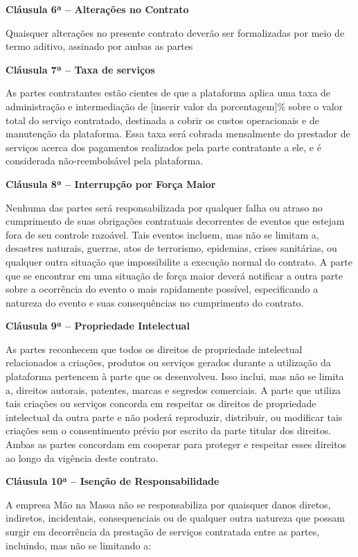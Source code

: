 \documentclass[a4paper,12pt]{article}
\begin{document}
\large{\textbf{Cláusula 6ª – Alterações no Contrato}}
\normalsize

Quaisquer alterações no presente contrato deverão ser formalizadas por meio de termo aditivo, assinado por ambas as partes

\large{\textbf{Cláusula 7ª – Taxa de serviços}}
\normalsize

As partes contratantes estão cientes de que a plataforma aplica uma taxa de administração e intermediação de [inserir valor da porcentagem]\% sobre o valor total do serviço contratado, destinada a cobrir os custos operacionais e de manutenção da plataforma. Essa taxa será  cobrada mensalmente do prestador de serviços acerca dos pagamentos realizados pela parte contratante a ele, e é considerada não-reembolsável pela plataforma.

\large{\textbf{Cláusula 8ª – Interrupção por Força Maior}}
\normalsize

Nenhuma das partes será responsabilizada por qualquer falha ou atraso no cumprimento de suas obrigações contratuais decorrentes de eventos que estejam fora de seu controle razoável. Tais eventos incluem, mas não se limitam a, desastres naturais, guerras, atos de terrorismo, epidemias, crises sanitárias, ou qualquer outra situação que impossibilite a execução normal do contrato. A parte que se encontrar em uma situação de força maior deverá notificar a outra parte sobre a ocorrência do evento o mais rapidamente possível, especificando a natureza do evento e suas consequências no cumprimento do contrato.

\large{\textbf{Cláusula 9ª – Propriedade Intelectual}}
\normalsize

As partes reconhecem que todos os direitos de propriedade intelectual relacionados a criações, produtos ou serviços gerados durante a utilização da plataforma pertencem à parte que os desenvolveu. Isso inclui, mas não se limita a, direitos autorais, patentes, marcas e segredos comerciais. A parte que utiliza tais criações ou serviços concorda em respeitar os direitos de propriedade intelectual da outra parte e não poderá reproduzir, distribuir, ou modificar tais criações sem o consentimento prévio por escrito da parte titular dos direitos. Ambas as partes concordam em cooperar para proteger e respeitar esses direitos ao longo da vigência deste contrato.

\large{\textbf{Cláusula 10ª – Isenção de Responsabilidade}}
\normalsize

A empresa Mão na Massa não se responsabiliza por quaisquer danos diretos, indiretos, incidentais, consequenciais ou de qualquer outra natureza que possam surgir em decorrência da prestação de serviços contratada entre as partes, incluindo, mas não se limitando a:
\end{document}
